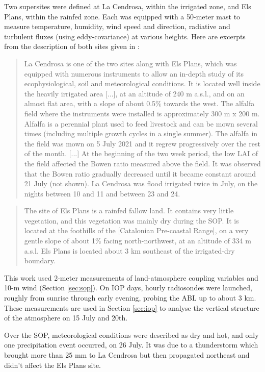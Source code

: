 Two supersites were defined at La Cendrosa, within the irrigated zone, and Els Plans, within the rainfed zone. Each was equipped with a 50-meter mast to measure temperature, humidity, wind speed and direction, radiative and turbulent fluxes (using eddy-covariance) at various heights.
Here are excerpts from the description of both sites given in \citet{lunel_interactions_2024}:
\begin{quote}
    La Cendrosa is one of the two sites along with Els Plans, which was equipped with numerous instruments to allow an in-depth study of its ecophysiological, soil and meteorological conditions. It is located well inside the heavily irrigated area [...], at an altitude of 240 m a.s.l., and on an almost flat area, with a slope of about 0.5\% towards the west.
    The alfalfa field where the instruments were installed is approximately 300 m x 200 m. Alfalfa is a perennial plant used to feed livestock and can be mown several times (including multiple growth cycles in a single summer). The alfalfa in the field was mown on 5 July 2021 and it regrew progressively over the rest of the month. [...] At the beginning of the two week period, the low LAI of the field affected the Bowen ratio measured above the field. It was observed that the Bowen ratio gradually decreased until it became constant around 21 July (not shown). La Cendrosa was flood irrigated twice in July, on the nights between 10 and 11 and between 23 and 24.
\end{quote}
\begin{quote}
    The site of Els Plans is a rainfed fallow land. It contains very little vegetation, and this vegetation was mainly dry during the SOP. It is located at the foothills of the [Catalonian Pre-coastal Range], on a very gentle slope of about 1\% facing north-northwest, at an altitude of 334 m a.s.l. Els Plans is located about 3 km southeast of the irrigated-dry boundary.
\end{quote}

This work used 2-meter measurements of land-atmosphere coupling variables and 10-m wind (Section \ref{sec:sop}).
On IOP days, hourly radiosondes were launched, roughly from  sunrise through early evening, probing the ABL up to about 3 km. These measurements are used in Section \ref{sec:iop} to analyse the vertical structure of the atmosphere on 15 July and 20th.

Over the SOP, meteorological conditions were described as dry and hot, and only one precipitation event occurred, on 26 July. It was due to a thunderstorm which brought more than 25 mm to La Cendrosa but then propagated northeast and didn't affect the Els Plans site.

